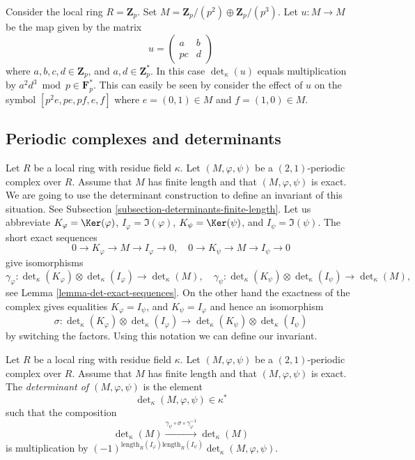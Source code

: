 \begin{example}
\label{example-determinant-map}
Consider the local ring $R = \mathbf{Z}_p$.
Set $M = \mathbf{Z}_p/(p^2) \oplus \mathbf{Z}_p/(p^3)$.
Let $u : M \to M$ be the map given by the matrix
$$
u =
\left(
\begin{matrix}
a & b \\
pc & d
\end{matrix}
\right)
$$
where $a, b, c, d \in \mathbf{Z}_p$, and $a, d \in \mathbf{Z}_p^*$.
In this case $\det_\kappa(u)$ equals multiplication by
$a^2d^3 \bmod p \in \mathbf{F}_p^*$. This can easily be seen
by consider the effect of $u$ on the symbol
$[p^2e, pe, pf, e, f]$ where $e = (0 , 1) \in M$ and
$f = (1, 0) \in M$.
\end{example}





\subsection{Periodic complexes and determinants}
\label{subsection-periodic-complexes-determinants}

\noindent
Let $R$ be a local ring with residue field $\kappa$.
Let $(M, \varphi, \psi)$ be a $(2, 1)$-periodic complex over $R$.
Assume that $M$ has finite length and that $(M, \varphi, \psi)$ is
exact. We are going to use the determinant construction to define
an invariant of this situation. See
Subsection \ref{subsection-determinants-finite-length}.
Let us abbreviate
$K_\varphi = \Ker(\varphi)$,
$I_\varphi = \Im(\varphi)$,
$K_\psi = \Ker(\psi)$, and
$I_\psi = \Im(\psi)$.
The short exact sequences
$$
0 \to K_\varphi \to M \to I_\varphi \to 0, \quad
0 \to K_\psi \to M \to I_\psi \to 0
$$
give isomorphisms
$$
\gamma_\varphi :
\det\nolimits_\kappa(K_\varphi)
\otimes
\det\nolimits_\kappa(I_\varphi)
\longrightarrow
\det\nolimits_\kappa(M), \quad
\gamma_\psi :
\det\nolimits_\kappa(K_\psi)
\otimes
\det\nolimits_\kappa(I_\psi)
\longrightarrow
\det\nolimits_\kappa(M),
$$
see Lemma \ref{lemma-det-exact-sequences}.
On the other hand the exactness of the complex gives equalities
$K_\varphi = I_\psi$, and $K_\psi = I_\varphi$
and hence an isomorphism
$$
\sigma :
\det\nolimits_\kappa(K_\varphi)
\otimes
\det\nolimits_\kappa(I_\varphi)
\longrightarrow
\det\nolimits_\kappa(K_\psi)
\otimes
\det\nolimits_\kappa(I_\psi)
$$
by switching the factors. Using this notation we can define our invariant.

\begin{definition}
\label{definition-periodic-determinant}
Let $R$ be a local ring with residue field $\kappa$.
Let $(M, \varphi, \psi)$ be a $(2, 1)$-periodic complex over $R$.
Assume that $M$ has finite length and that $(M, \varphi, \psi)$ is
exact. The {\it determinant of $(M, \varphi, \psi)$} is
the element
$$
\det\nolimits_\kappa(M, \varphi, \psi) \in \kappa^*
$$
such that the composition
$$
\det\nolimits_\kappa(M)
\xrightarrow{\gamma_\psi \circ \sigma \circ \gamma_\varphi^{-1}}
\det\nolimits_\kappa(M)
$$
is multiplication by
$(-1)^{\text{length}_R(I_\varphi)\text{length}_R(I_\psi)}
\det\nolimits_\kappa(M, \varphi, \psi)$.
\end{definition}

